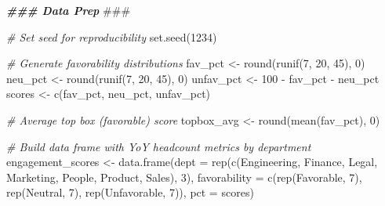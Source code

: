 \documentclass[
]{book}
\newenvironment{Shaded}{\begin{snugshade}}{\end{snugshade}}
\newcommand{\AlertTok}[1]{\textcolor[rgb]{0.94,0.16,0.16}{#1}}
\newcommand{\AttributeTok}[1]{\textcolor[rgb]{0.77,0.63,0.00}{#1}}
\newcommand{\CommentTok}[1]{\textcolor[rgb]{0.56,0.35,0.01}{\textit{#1}}}
\newcommand{\DecValTok}[1]{\textcolor[rgb]{0.00,0.00,0.81}{#1}}
\newcommand{\DocumentationTok}[1]{\textcolor[rgb]{0.56,0.35,0.01}{\textbf{\textit{#1}}}}
\newcommand{\FunctionTok}[1]{\textcolor[rgb]{0.00,0.00,0.00}{#1}}
\newcommand{\NormalTok}[1]{#1}
\newcommand{\OtherTok}[1]{\textcolor[rgb]{0.56,0.35,0.01}{#1}}
\newcommand{\SpecialCharTok}[1]{\textcolor[rgb]{0.00,0.00,0.00}{#1}}
\newcommand{\StringTok}[1]{\textcolor[rgb]{0.31,0.60,0.02}{#1}}
\begin{document}
\begin{Shaded}
\begin{Highlighting}[]
\DocumentationTok{\#\#\# Data Prep }\AlertTok{\#\#\#}

\CommentTok{\# Set seed for reproducibility}
\FunctionTok{set.seed}\NormalTok{(}\DecValTok{1234}\NormalTok{)}

\CommentTok{\# Generate favorability distributions}
\NormalTok{fav\_pct }\OtherTok{\textless{}{-}} \FunctionTok{round}\NormalTok{(}\FunctionTok{runif}\NormalTok{(}\DecValTok{7}\NormalTok{, }\DecValTok{20}\NormalTok{, }\DecValTok{45}\NormalTok{), }\DecValTok{0}\NormalTok{)}
\NormalTok{neu\_pct }\OtherTok{\textless{}{-}} \FunctionTok{round}\NormalTok{(}\FunctionTok{runif}\NormalTok{(}\DecValTok{7}\NormalTok{, }\DecValTok{20}\NormalTok{, }\DecValTok{45}\NormalTok{), }\DecValTok{0}\NormalTok{)}
\NormalTok{unfav\_pct }\OtherTok{\textless{}{-}} \DecValTok{100} \SpecialCharTok{{-}}\NormalTok{ fav\_pct }\SpecialCharTok{{-}}\NormalTok{ neu\_pct}
\NormalTok{scores }\OtherTok{\textless{}{-}} \FunctionTok{c}\NormalTok{(fav\_pct, neu\_pct, unfav\_pct)}

\CommentTok{\# Average top box (favorable) score}
\NormalTok{topbox\_avg }\OtherTok{\textless{}{-}} \FunctionTok{round}\NormalTok{(}\FunctionTok{mean}\NormalTok{(fav\_pct), }\DecValTok{0}\NormalTok{)}

\CommentTok{\# Build data frame with YoY headcount metrics by department}
\NormalTok{engagement\_scores }\OtherTok{\textless{}{-}} \FunctionTok{data.frame}\NormalTok{(}\AttributeTok{dept =} \FunctionTok{rep}\NormalTok{(}\FunctionTok{c}\NormalTok{(}\StringTok{\textquotesingle{}Engineering\textquotesingle{}}\NormalTok{, }\StringTok{\textquotesingle{}Finance\textquotesingle{}}\NormalTok{, }\StringTok{\textquotesingle{}Legal\textquotesingle{}}\NormalTok{, }\StringTok{\textquotesingle{}Marketing\textquotesingle{}}\NormalTok{, }\StringTok{\textquotesingle{}People\textquotesingle{}}\NormalTok{, }\StringTok{\textquotesingle{}Product\textquotesingle{}}\NormalTok{, }\StringTok{\textquotesingle{}Sales\textquotesingle{}}\NormalTok{), }\DecValTok{3}\NormalTok{),}
                                \AttributeTok{favorability =} \FunctionTok{c}\NormalTok{(}\FunctionTok{rep}\NormalTok{(}\StringTok{\textquotesingle{}Favorable\textquotesingle{}}\NormalTok{, }\DecValTok{7}\NormalTok{), }\FunctionTok{rep}\NormalTok{(}\StringTok{\textquotesingle{}Neutral\textquotesingle{}}\NormalTok{, }\DecValTok{7}\NormalTok{), }\FunctionTok{rep}\NormalTok{(}\StringTok{\textquotesingle{}Unfavorable\textquotesingle{}}\NormalTok{, }\DecValTok{7}\NormalTok{)),}
                                \AttributeTok{pct =}\NormalTok{ scores)}


\end{Highlighting}
\end{Shaded}
\end{document}
